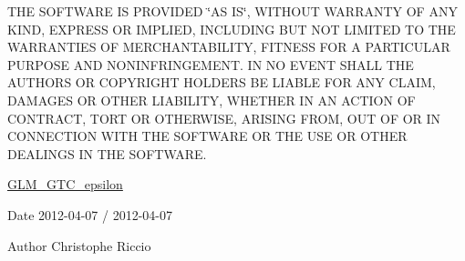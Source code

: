 T\+H\+E S\+O\+F\+T\+W\+A\+R\+E I\+S P\+R\+O\+V\+I\+D\+E\+D \char`\"{}\+A\+S I\+S\char`\"{}, W\+I\+T\+H\+O\+U\+T W\+A\+R\+R\+A\+N\+T\+Y O\+F A\+N\+Y K\+I\+N\+D, E\+X\+P\+R\+E\+S\+S O\+R I\+M\+P\+L\+I\+E\+D, I\+N\+C\+L\+U\+D\+I\+N\+G B\+U\+T N\+O\+T L\+I\+M\+I\+T\+E\+D T\+O T\+H\+E W\+A\+R\+R\+A\+N\+T\+I\+E\+S O\+F M\+E\+R\+C\+H\+A\+N\+T\+A\+B\+I\+L\+I\+T\+Y, F\+I\+T\+N\+E\+S\+S F\+O\+R A P\+A\+R\+T\+I\+C\+U\+L\+A\+R P\+U\+R\+P\+O\+S\+E A\+N\+D N\+O\+N\+I\+N\+F\+R\+I\+N\+G\+E\+M\+E\+N\+T. I\+N N\+O E\+V\+E\+N\+T S\+H\+A\+L\+L T\+H\+E A\+U\+T\+H\+O\+R\+S O\+R C\+O\+P\+Y\+R\+I\+G\+H\+T H\+O\+L\+D\+E\+R\+S B\+E L\+I\+A\+B\+L\+E F\+O\+R A\+N\+Y C\+L\+A\+I\+M, D\+A\+M\+A\+G\+E\+S O\+R O\+T\+H\+E\+R L\+I\+A\+B\+I\+L\+I\+T\+Y, W\+H\+E\+T\+H\+E\+R I\+N A\+N A\+C\+T\+I\+O\+N O\+F C\+O\+N\+T\+R\+A\+C\+T, T\+O\+R\+T O\+R O\+T\+H\+E\+R\+W\+I\+S\+E, A\+R\+I\+S\+I\+N\+G F\+R\+O\+M, O\+U\+T O\+F O\+R I\+N C\+O\+N\+N\+E\+C\+T\+I\+O\+N W\+I\+T\+H T\+H\+E S\+O\+F\+T\+W\+A\+R\+E O\+R T\+H\+E U\+S\+E O\+R O\+T\+H\+E\+R D\+E\+A\+L\+I\+N\+G\+S I\+N T\+H\+E S\+O\+F\+T\+W\+A\+R\+E.

\hyperlink{group__gtc__epsilon}{G\+L\+M\+\_\+\+G\+T\+C\+\_\+epsilon}

\begin{DoxyDate}{Date}
2012-\/04-\/07 / 2012-\/04-\/07 
\end{DoxyDate}
\begin{DoxyAuthor}{Author}
Christophe Riccio 
\end{DoxyAuthor}
